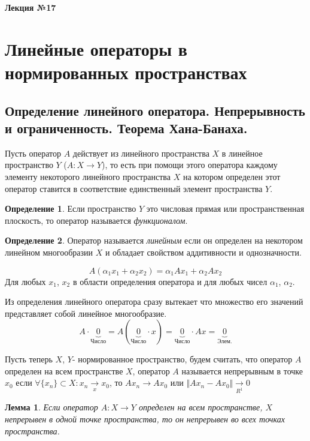 \documentclass[14pt,a4paper]{extarticle}
\newtheorem{lemma}{Лемма}[section]
\theoremstyle{definition}
\newtheorem{definition}{Определение}[section]
\theoremstyle{remark}
\renewcommand{\[}{\begin{dmath*}[compact]}
\renewcommand{\]}{\end{dmath*}}
\begin{document}
\textbf{Лекция №17}

\section{Линейные операторы в нормированных пространствах}

\subsection{Определение линейного оператора. Непрерывность и ограниченность.
Теорема Хана-Банаха.}

Пусть оператор $A$ действует из линейного пространства $X$ в
линейное пространство $Y$ ($A: X \to Y$), то есть при помощи этого оператора
каждому элементу некоторого линейного пространства $X$ на котором определен
этот оператор ставится в соответствие единственный элемент пространства $Y$.

\begin{definition}
  Если пространство $Y$ это числовая прямая или пространственная плоскость,
  то оператор называется \textit{функционалом}.
\end{definition}

\begin{definition}
  Оператор называется \textit{линейным} если он определен на некотором
  линейном многообразии $X$ и обладает свойством аддитивности и однозначности.
\end{definition}

\[A(\alpha_1x_1 + \alpha_2x_2) = \alpha_1Ax_1 + \alpha_2Ax_2\]
Для любых $x_1$, $x_2$ в области определения оператора и для любых чисел
$\alpha_1$, $\alpha_2$.

Из определения линейного оператора сразу вытекает что множество его значений
представляет собой линейное многообразие.
\[A \cdot \underbrace{0}_{\text{Число}} =
A (\underbrace{0}_{\text{Число}} \cdot x) =
\underbrace{0}_{\text{Число}} \cdot Ax = \underbrace{0}_{\text{Элем.}}\]

Пусть теперь $X$, $Y$- нормированное пространство, будем считать, что оператор
$A$ определен на всем пространстве $X$, оператор $A$ называется непрерывным
в точке $x_0$ если
$ \forall \{x_n\} \subset X: x_n \underset{x}{\to} x_0 $,
то $Ax_n \to Ax_0$ или  $\Vert Ax_n - A x_0 \Vert \underset{R^1}{\to}0$

\begin{lemma}
  Если оператор $A: X \to Y$ определен на всем пространстве,
  $X$ непрерывен в одной точке пространства,
  то он непрерывен во всех точках пространства.
\end{lemma}
\end{document}
